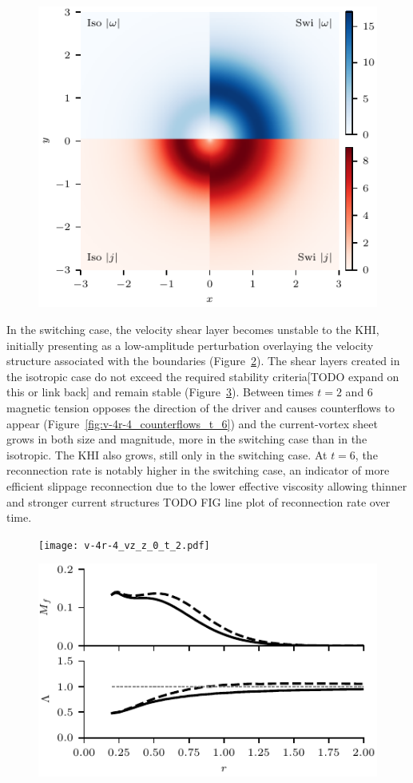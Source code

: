 \begin{figure}[t]
  \centering
  \includegraphics[width=0.48\linewidth]{v-4r-4_vorticity_current_ring_t_3}
  \caption{}%
  \label{fig:v-4r-4_vorticity_current_ring_t_3}
\end{figure}

In the switching case, the velocity shear layer becomes unstable to the KHI, initially presenting as a low-amplitude perturbation overlaying the velocity structure associated with the boundaries (Figure~\ref{fig:v-4r-4_vz_z_0_t_2}). The shear layers created in the isotropic case do not exceed the required stability criteria[TODO expand on this or link back] and remain stable (Figure~\ref{fig:v-4r-4_mach_t_2}). Between times $t=2$ and $6$ magnetic tension opposes the direction of the driver and causes counterflows to appear (Figure~\ref{fig:v-4r-4_counterflows_t_6}) and the current-vortex sheet grows in both size and magnitude, more in the switching case than in the isotropic. The KHI also grows, still only in the switching case. At $t=6$, the reconnection rate is notably higher in the switching case, an indicator of more efficient slippage reconnection due to the lower effective viscosity allowing thinner and stronger current structures TODO FIG line plot of reconnection rate over time.

\begin{figure}[t]
  \centering
  \texttt{[image: v-4r-4\_vz\_z\_0\_t\_2.pdf]}
  \caption{}%
  \label{fig:v-4r-4_vz_z_0_t_2}
\end{figure}

\begin{figure}[t]
  \centering
  \includegraphics[width=0.9\linewidth]{v-4r-4_mach_t_2.pdf}
  \caption{}%
  \label{fig:v-4r-4_mach_t_2}
\end{figure}

